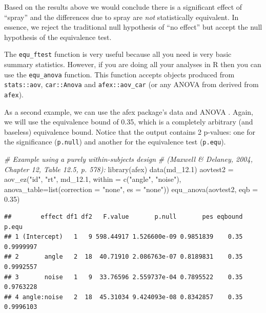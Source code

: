 \documentclass[]{interact}
\theoremstyle{plain}%
\theoremstyle{definition}
\theoremstyle{remark}
\newenvironment{Shaded}{\begin{snugshade}}{\end{snugshade}}
\newcommand{\AttributeTok}[1]{\textcolor[rgb]{0.77,0.63,0.00}{#1}}
\newcommand{\CommentTok}[1]{\textcolor[rgb]{0.56,0.35,0.01}{\textit{#1}}}
\newcommand{\FloatTok}[1]{\textcolor[rgb]{0.00,0.00,0.81}{#1}}
\newcommand{\FunctionTok}[1]{\textcolor[rgb]{0.00,0.00,0.00}{#1}}
\newcommand{\NormalTok}[1]{#1}
\newcommand{\OtherTok}[1]{\textcolor[rgb]{0.56,0.35,0.01}{#1}}
\newcommand{\StringTok}[1]{\textcolor[rgb]{0.31,0.60,0.02}{#1}}
\begin{document}
Based on the results above we would conclude there is a significant
effect of ``spray'' and the differences due to spray are \emph{not}
statistically equivalent. In essence, we reject the traditional null
hypothesis of ``no effect'' but accept the null hypothesis of the
equivalence test.

\newpage

The \texttt{equ\_ftest} function is very useful because all you need is
very basic summary statistics. However, if you are doing all your
analyses in R then you can use the \texttt{equ\_anova} function. This
function accepts objects produced from \texttt{stats::aov},
\texttt{car::Anova} and \texttt{afex::aov\_car} (or any ANOVA from
derived from \texttt{afex}).

As a second example, we can use the afex package's data and ANOVA
\citep{afex}. Again, we will use the equivalence bound of 0.35, which is
a completely arbitrary (and baseless) equivalence bound. Notice that the
output contains 2 p-values: one for the significance (\texttt{p.null})
and another for the equivalence test (\texttt{p.equ}).

\begin{Shaded}
\begin{Highlighting}[]
\CommentTok{\# Example using a purely within{-}subjects design }
\CommentTok{\# (Maxwell \& Delaney, 2004, Chapter 12, Table 12.5, p. 578):}
\FunctionTok{library}\NormalTok{(afex)}
\FunctionTok{data}\NormalTok{(md\_12}\FloatTok{.1}\NormalTok{)}
\NormalTok{aovtest2 }\OtherTok{=} \FunctionTok{aov\_ez}\NormalTok{(}\StringTok{"id"}\NormalTok{, }\StringTok{"rt"}\NormalTok{, md\_12}\FloatTok{.1}\NormalTok{, }\AttributeTok{within =} \FunctionTok{c}\NormalTok{(}\StringTok{"angle"}\NormalTok{, }\StringTok{"noise"}\NormalTok{), }
       \AttributeTok{anova\_table=}\FunctionTok{list}\NormalTok{(}\AttributeTok{correction =} \StringTok{"none"}\NormalTok{, }\AttributeTok{es =} \StringTok{"none"}\NormalTok{))}
\FunctionTok{equ\_anova}\NormalTok{(aovtest2,}
          \AttributeTok{eqb =} \FloatTok{0.35}\NormalTok{)}
\end{Highlighting}
\end{Shaded}

\begin{verbatim}
##        effect df1 df2   F.value       p.null       pes eqbound     p.equ
## 1 (Intercept)   1   9 598.44917 1.526600e-09 0.9851839    0.35 0.9999997
## 2       angle   2  18  40.71910 2.086763e-07 0.8189831    0.35 0.9992557
## 3       noise   1   9  33.76596 2.559737e-04 0.7895522    0.35 0.9763228
## 4 angle:noise   2  18  45.31034 9.424093e-08 0.8342857    0.35 0.9996103
\end{verbatim}
\end{document}
